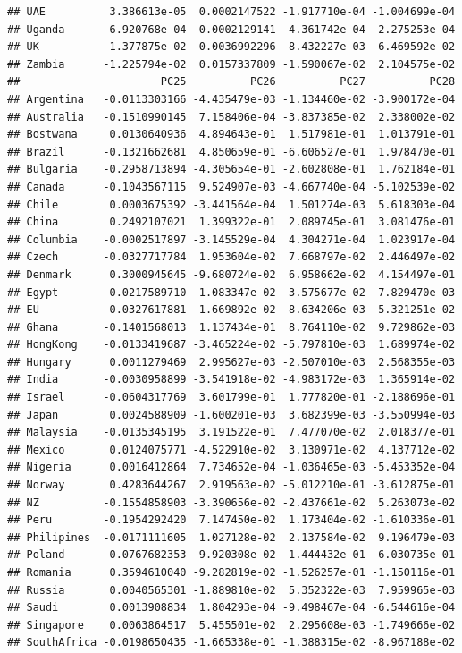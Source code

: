 \documentclass[11pt,preprint, authoryear]{elsarticle}
\numberwithin{equation}{section}
\numberwithin{figure}{section}
\numberwithin{table}{section}
\begin{document}
\begin{verbatim}
## UAE          3.386613e-05  0.0002147522 -1.917710e-04 -1.004699e-04
## Uganda      -6.920768e-04  0.0002129141 -4.361742e-04 -2.275253e-04
## UK          -1.377875e-02 -0.0036992296  8.432227e-03 -6.469592e-02
## Zambia      -1.225794e-02  0.0157337809 -1.590067e-02  2.104575e-02
##                      PC25          PC26          PC27          PC28
## Argentina   -0.0113303166 -4.435479e-03 -1.134460e-02 -3.900172e-04
## Australia   -0.1510990145  7.158406e-04 -3.837385e-02  2.338002e-02
## Bostwana     0.0130640936  4.894643e-01  1.517981e-01  1.013791e-01
## Brazil      -0.1321662681  4.850659e-01 -6.606527e-01  1.978470e-01
## Bulgaria    -0.2958713894 -4.305654e-01 -2.602808e-01  1.762184e-01
## Canada      -0.1043567115  9.524907e-03 -4.667740e-04 -5.102539e-02
## Chile        0.0003675392 -3.441564e-04  1.501274e-03  5.618303e-04
## China        0.2492107021  1.399322e-01  2.089745e-01  3.081476e-01
## Columbia    -0.0002517897 -3.145529e-04  4.304271e-04  1.023917e-04
## Czech       -0.0327717784  1.953604e-02  7.668797e-02  2.446497e-02
## Denmark      0.3000945645 -9.680724e-02  6.958662e-02  4.154497e-01
## Egypt       -0.0217589710 -1.083347e-02 -3.575677e-02 -7.829470e-03
## EU           0.0327617881 -1.669892e-02  8.634206e-03  5.321251e-02
## Ghana       -0.1401568013  1.137434e-01  8.764110e-02  9.729862e-03
## HongKong    -0.0133419687 -3.465224e-02 -5.797810e-03  1.689974e-02
## Hungary      0.0011279469  2.995627e-03 -2.507010e-03  2.568355e-03
## India       -0.0030958899 -3.541918e-02 -4.983172e-03  1.365914e-02
## Israel      -0.0604317769  3.601799e-01  1.777820e-01 -2.188696e-01
## Japan        0.0024588909 -1.600201e-03  3.682399e-03 -3.550994e-03
## Malaysia    -0.0135345195  3.191522e-01  7.477070e-02  2.018377e-01
## Mexico       0.0124075771 -4.522910e-02  3.130971e-02  4.137712e-02
## Nigeria      0.0016412864  7.734652e-04 -1.036465e-03 -5.453352e-04
## Norway       0.4283644267  2.919563e-02 -5.012210e-01 -3.612875e-01
## NZ          -0.1554858903 -3.390656e-02 -2.437661e-02  5.263073e-02
## Peru        -0.1954292420  7.147450e-02  1.173404e-02 -1.610336e-01
## Philipines  -0.0171111605  1.027128e-02  2.137584e-02  9.196479e-03
## Poland      -0.0767682353  9.920308e-02  1.444432e-01 -6.030735e-01
## Romania      0.3594610040 -9.282819e-02 -1.526257e-01 -1.150116e-01
## Russia       0.0040565301 -1.889810e-02  5.352322e-03  7.959965e-03
## Saudi        0.0013908834  1.804293e-04 -9.498467e-04 -6.544616e-04
## Singapore    0.0063864517  5.455501e-02  2.295608e-03 -1.749666e-02
## SouthAfrica -0.0198650435 -1.665338e-01 -1.388315e-02 -8.967188e-02

\end{verbatim}
\end{document}
